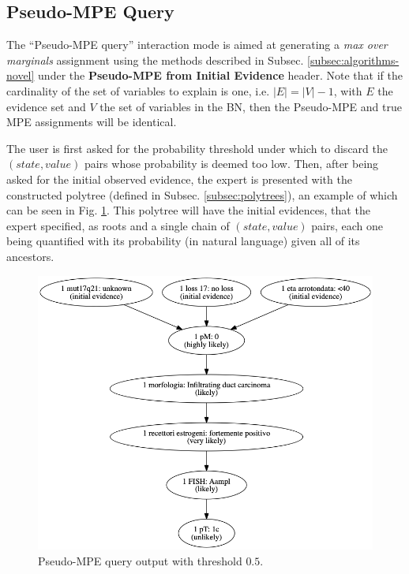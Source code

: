 \subsection{Pseudo-MPE Query}
The \enquote{Pseudo-MPE query} interaction mode is aimed at generating a \textit{max over marginals} assignment using the methods described in Subsec. \ref{subsec:algorithms-novel} under the \textbf{Pseudo-MPE from Initial Evidence} header.
Note that if the cardinality of the set of variables to explain is one, i.e. $|E| = |V|-1$, with $E$ the evidence set and $V$ the set of variables in the BN, then the Pseudo-MPE and true MPE assignments will be identical.

The user is first asked for the probability threshold under which to discard the $(state, value)$ pairs whose probability is deemed too low.
Then, after being asked for the initial observed evidence, the expert is presented with the constructed polytree (defined in Subsec. \ref{subsec:polytrees}), an example of which can be seen in Fig. \ref{fig:pseudo_mpe_output}.
This polytree will have the initial evidences, that the expert specified, as roots and a single chain of $(state, value)$ pairs, each one being quantified with its probability (in natural language) given all of its ancestors.

\begin{figure}[htbp]
\centerline{\includegraphics[width=\columnwidth]{results/images/pseudo_mpe_output}}
\caption{Pseudo-MPE query output with threshold $0.5$.}
\label{fig:pseudo_mpe_output}
\end{figure}

